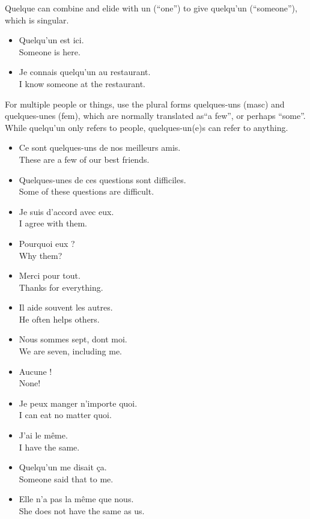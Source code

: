 Quelque can combine and elide with un (``one'') to give quelqu'un (``someone''), which is singular.

\begin{itemize}
  \item  Quelqu'un est ici. \\ Someone is here.
	\item  Je connais quelqu'un au restaurant. \\ I know someone at the restaurant.
\end{itemize}

For multiple people or things, use the plural forms quelques-uns (masc) and quelques-unes (fem), which are normally translated as``a few'', or perhaps ``some''.  While quelqu'un only refers to people, quelques-un(e)s can refer to anything.

\begin{itemize}
  \item  Ce sont quelques-uns de nos meilleurs amis. \\ These are a few of our best friends.
	\item  Quelques-unes de ces questions sont difficiles. \\ Some of these questions are difficult.
\end{itemize}

\begin{itemize}
  \item  Je suis d'accord avec eux. \\ I agree with them.
	\item  Pourquoi eux ? \\ Why them?
	\item  Merci pour tout. \\ Thanks for everything.
	\item  Il aide souvent les autres. \\ He often helps others.
	\item  Nous sommes sept, dont moi. \\ We are seven, including me.
	\item  Aucune ! \\ None!
	\item  Je peux manger n'importe quoi. \\ I can eat no matter quoi.
	\item  J'ai le m{\^e}me. \\ I have the same.
	\item  Quelqu'un me disait {\c c}a. \\ Someone said that to me.
	\item  Elle n'a pas la m{\^e}me que nous. \\ She does not have the same as us.
\end{itemize}


